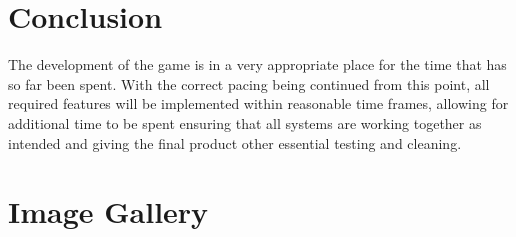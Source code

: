 \documentclass[11pt]{article}
\begin{document}
\section{Conclusion}
The development of the game is in a very appropriate place for the time that has so far been spent. With the correct pacing being continued from this point, all required features will be implemented within reasonable time frames, allowing for additional time to be spent ensuring that all systems are working together as intended and giving the final product other essential testing and cleaning. \\

\clearpage

\appendix

\section{Image Gallery}


\clearpage
\end{document}
